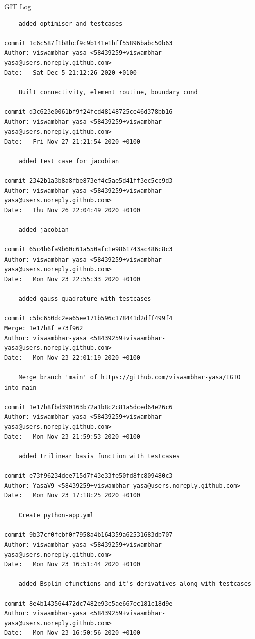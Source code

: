 \documentclass[a4paper,12pt,times]{article}
\begin{document}
\begin{section}{GIT Log}
\begin{verbatim}
    added optimiser and testcases

commit 1c6c587f1b8bcf9c9b141e1bff55896babc50b63
Author: viswambhar-yasa <58439259+viswambhar-yasa@users.noreply.github.com>
Date:   Sat Dec 5 21:12:26 2020 +0100

    Built connectivity, element routine, boundary cond

commit d3c623e0061bf9f24fcd48148725ce46d378bb16
Author: viswambhar-yasa <58439259+viswambhar-yasa@users.noreply.github.com>
Date:   Fri Nov 27 21:21:54 2020 +0100

    added test case for jacobian

commit 2342b1a3b8a8fbe873ef4c5ae5d41ff3ec5cc9d3
Author: viswambhar-yasa <58439259+viswambhar-yasa@users.noreply.github.com>
Date:   Thu Nov 26 22:04:49 2020 +0100

    added jacobian

commit 65c4b6fa9b60c61a550afc1e9861743ac486c8c3
Author: viswambhar-yasa <58439259+viswambhar-yasa@users.noreply.github.com>
Date:   Mon Nov 23 22:55:33 2020 +0100

    added gauss quadrature with testcases

commit c5bc650dc2ea65ee171b596c178441d2dff499f4
Merge: 1e17b8f e73f962
Author: viswambhar-yasa <58439259+viswambhar-yasa@users.noreply.github.com>
Date:   Mon Nov 23 22:01:19 2020 +0100

    Merge branch 'main' of https://github.com/viswambhar-yasa/IGTO into main

commit 1e17b8fbd390163b72a1b8c2c81a5dced64e26c6
Author: viswambhar-yasa <58439259+viswambhar-yasa@users.noreply.github.com>
Date:   Mon Nov 23 21:59:53 2020 +0100

    added trilinear basis function with testcases

commit e73f96234dee715d7f43e33fe50fd8fc809480c3
Author: YasaV9 <58439259+viswambhar-yasa@users.noreply.github.com>
Date:   Mon Nov 23 17:18:25 2020 +0100

    Create python-app.yml

commit 9b37cf0fcbf0f7958a4b164359a62531683db707
Author: viswambhar-yasa <58439259+viswambhar-yasa@users.noreply.github.com>
Date:   Mon Nov 23 16:51:44 2020 +0100

    added Bsplin efunctions and it's derivatives along with testcases

commit 8e4b143564472dc7482e93c5ae667ec181c18d9e
Author: viswambhar-yasa <58439259+viswambhar-yasa@users.noreply.github.com>
Date:   Mon Nov 23 16:50:56 2020 +0100


\end{verbatim}
\end{section}
\end{document}
